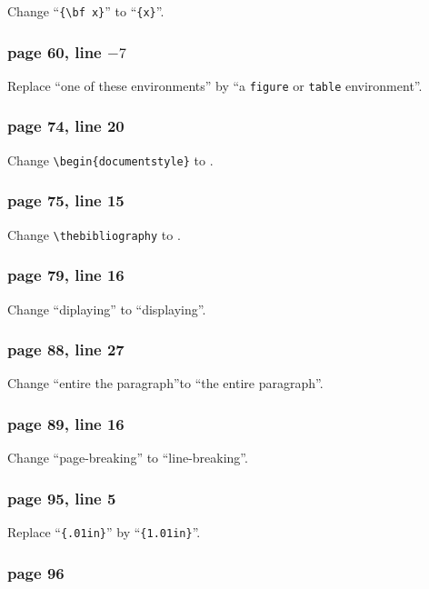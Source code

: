 Change ``\verb|{\bf x}|'' to ``\verb|{x}|''.

\subsubsection*{page 60, line $-7$}

Replace ``one of these environments'' by ``a {\tt figure} or
{\tt table} environment''.

\subsubsection*{page 74, line 20}
Change \verb|\begin{documentstyle}| to \verb||.


\subsubsection*{page 75, line 15}
Change \verb|\thebibliography|  to \verb||.

\subsubsection*{page 79, line 16}
Change ``diplaying'' to ``displaying''.

\subsubsection*{page 88, line 27}

Change ``entire the paragraph''to ``the entire paragraph''.

\subsubsection*{page 89, line 16}

Change ``page-breaking'' to ``line-breaking''.  

\subsubsection*{page 95, line 5}

Replace ``\verb|{.01in}|'' by ``\verb|{1.01in}|''.

\subsubsection*{page 96}

